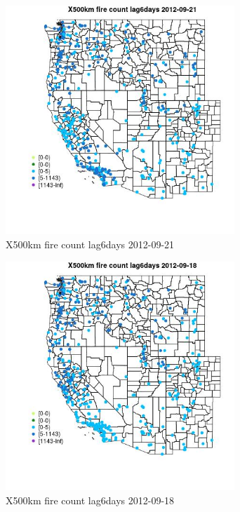 \begin{figure} 
\centering  
\includegraphics[width=0.77\textwidth]{Code_Outputs/Report_ML_input_PM25_Step4_part_e_de_duplicated_aves_compiled_2019-05-14wNAs_MapObsX500km_fire_count_lag6days2012-09-21.jpg} 
\caption{\label{fig:Report_ML_input_PM25_Step4_part_e_de_duplicated_aves_compiled_2019-05-14wNAsMapObsX500km_fire_count_lag6days2012-09-21}X500km fire count lag6days 2012-09-21} 
\end{figure} 
 

\begin{figure} 
\centering  
\includegraphics[width=0.77\textwidth]{Code_Outputs/Report_ML_input_PM25_Step4_part_e_de_duplicated_aves_compiled_2019-05-14wNAs_MapObsX500km_fire_count_lag6days2012-09-18.jpg} 
\caption{\label{fig:Report_ML_input_PM25_Step4_part_e_de_duplicated_aves_compiled_2019-05-14wNAsMapObsX500km_fire_count_lag6days2012-09-18}X500km fire count lag6days 2012-09-18} 
\end{figure} 
 

